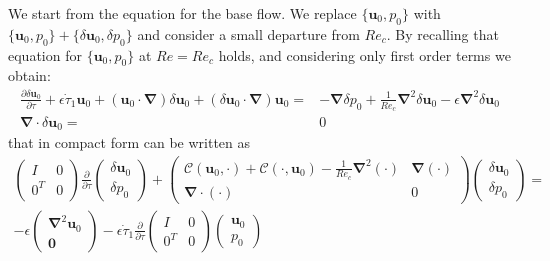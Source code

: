 We start from the equation for the base flow. We replace $\{\bm{u}_0,p_0\}$ with $\{\bm{u}_0,p_0\} + \{\delta \bm{u}_0,\delta p_0\}$ and consider a small departure from $Re_c$. By recalling that equation for $\{\bm{u}_0,p_0\}$ at $Re=Re_c$ holds, and considering only first order terms we obtain:
%
\begin{equation}
  \begin{aligned}
    \frac{\partial \delta \bm{u}_0}{\partial \tau} + \epsilon \dot{\tau}_1 \bm{u}_0 + ( \bm{u}_0 \cdot \bm{\nabla} ) \delta \bm{u}_0 +
                                                                                     ( \delta \bm{u}_0 \cdot \bm{\nabla} ) \bm{u}_0 = & - \bm{\nabla} \delta p_0 +
                                                                                     \frac{1}{Re_c} \bm{\nabla}^2 \delta \bm{u}_0 - 
                                                                                     \epsilon       \bm{\nabla}^2 \delta \bm{u}_0 \\
                                                \bm{\nabla} \cdot \delta \bm{u}_0 = & 0
  \end{aligned}
\end{equation} 
%
that in compact form can be written as
%
\begin{equation}
  \begin{aligned}
  \begin{pmatrix} I & 0 \\ 0^T & 0 \end{pmatrix} \frac{\partial}{\partial \tau} \begin{pmatrix} \delta \bm{u}_0 \\ \delta p_0 \end{pmatrix} +
  \begin{pmatrix} \mathcal{C}( \bm{u}_0, \cdot ) + \mathcal{C}(\cdot,\bm{u}_0)-\frac{1}{Re_c} \bm{\nabla}^2(\cdot) & \bm{\nabla}(\cdot) \\
                     \bm{\nabla} \cdot ( \cdot )                                                                   &  0   \end{pmatrix}
                     \begin{pmatrix} \delta \bm{u}_0 \\ \delta p_0 \end{pmatrix} = \\
                     - \epsilon \begin{pmatrix} \bm{\nabla}^2 \bm{u}_0 \\ \bm{0} \end{pmatrix} - 
                       \epsilon \dot{\tau}_1 \frac{\partial}{\partial \tau}  \begin{pmatrix} I & 0 \\ 0^T & 0 \end{pmatrix}\begin{pmatrix} \bm{u}_0 \\  p_0 \end{pmatrix} 
  \end{aligned}
\end{equation}
